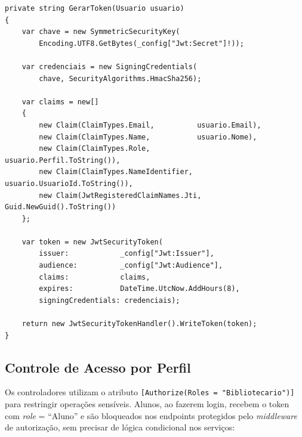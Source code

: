 \documentclass[
  12pt,
  a4paper,
  oneside,
  brazil
]{abntex2}
\begin{document}
\begin{lstlisting}[style=csharp, caption={Geração de token JWT com claims de perfil}, label=lst:jwt]
private string GerarToken(Usuario usuario)
{
    var chave = new SymmetricSecurityKey(
        Encoding.UTF8.GetBytes(_config["Jwt:Secret"]!));

    var credenciais = new SigningCredentials(
        chave, SecurityAlgorithms.HmacSha256);

    var claims = new[]
    {
        new Claim(ClaimTypes.Email,          usuario.Email),
        new Claim(ClaimTypes.Name,           usuario.Nome),
        new Claim(ClaimTypes.Role,           usuario.Perfil.ToString()),
        new Claim(ClaimTypes.NameIdentifier, usuario.UsuarioId.ToString()),
        new Claim(JwtRegisteredClaimNames.Jti, Guid.NewGuid().ToString())
    };

    var token = new JwtSecurityToken(
        issuer:            _config["Jwt:Issuer"],
        audience:          _config["Jwt:Audience"],
        claims:            claims,
        expires:           DateTime.UtcNow.AddHours(8),
        signingCredentials: credenciais);

    return new JwtSecurityTokenHandler().WriteToken(token);
}
\end{lstlisting}

\subsection{Controle de Acesso por Perfil}

Os controladores utilizam o atributo \texttt{[Authorize(Roles = "Bibliotecario")]} para restringir operações sensíveis. Alunos, ao fazerem login, recebem o token com \textit{role} = ``Aluno'' e são bloqueados nos endpoints protegidos pelo \textit{middleware} de autorização, sem precisar de lógica condicional nos serviços:
\end{document}
